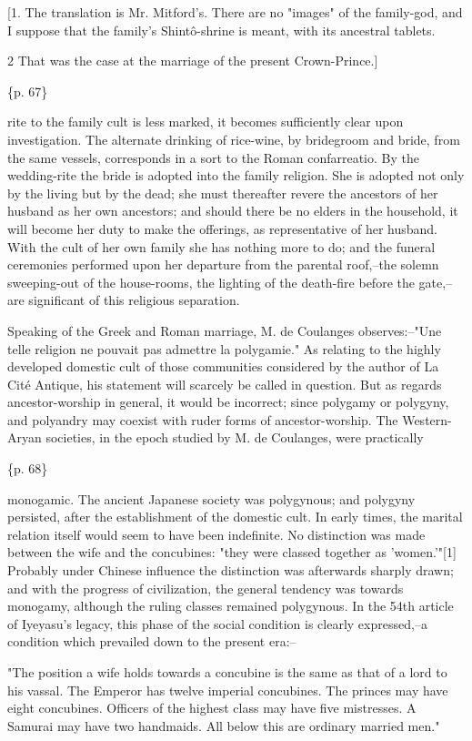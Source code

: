 [1. The translation is Mr. Mitford's. There are no "images" of the family-god, and I suppose that the family's Shintô-shrine is meant, with its ancestral tablets.

2 That was the case at the marriage of the present Crown-Prince.]

\{p. 67\}

rite to the family cult is less marked, it becomes sufficiently clear upon investigation. The alternate drinking of rice-wine, by bridegroom and bride, from the same vessels, corresponds in a sort to the Roman confarreatio. By the wedding-rite the bride is adopted into the family religion. She is adopted not only by the living but by the dead; she must thereafter revere the ancestors of her husband as her own ancestors; and should there be no elders in the household, it will become her duty to make the offerings, as representative of her husband. With the cult of her own family she has nothing more to do; and the funeral ceremonies performed upon her departure from the parental roof,--the solemn sweeping-out of the house-rooms, the lighting of the death-fire before the gate,--are significant of this religious separation.

Speaking of the Greek and Roman marriage, M. de Coulanges observes:--"Une telle religion ne pouvait pas admettre la polygamie." As relating to the highly developed domestic cult of those communities considered by the author of La Cité Antique, his statement will scarcely be called in question. But as regards ancestor-worship in general, it would be incorrect; since polygamy or polygyny, and polyandry may coexist with ruder forms of ancestor-worship. The Western-Aryan societies, in the epoch studied by M. de Coulanges, were practically

\{p. 68\}

monogamic. The ancient Japanese society was polygynous; and polygyny persisted, after the establishment of the domestic cult. In early times, the marital relation itself would seem to have been indefinite. No distinction was made between the wife and the concubines: "they were classed together as 'women.'"[1] Probably under Chinese influence the distinction was afterwards sharply drawn; and with the progress of civilization, the general tendency was towards monogamy, although the ruling classes remained polygynous. In the 54th article of Iyeyasu's legacy, this phase of the social condition is clearly expressed,--a condition which prevailed down to the present era:--

"The position a wife holds towards a concubine is the same as that of a lord to his vassal. The Emperor has twelve imperial concubines. The princes may have eight concubines. Officers of the highest class may have five mistresses. A Samurai may have two handmaids. All below this are ordinary married men."

